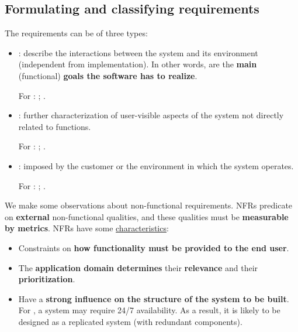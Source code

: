 \subsection{Formulating and classifying requirements}

The requirements can be of three types:
\begin{itemize}
    \item {}: describe the interactions between the system and its environment (independent from implementation). In other words, are the \textbf{main} (functional) \textbf{goals the software has to realize}.
    
    For \emph{}: ; .


    \item {}: further characterization of user-visible aspects of the system not directly related to functions.
    
    For \emph{}: ; .
    

    \item {}: imposed by the customer or the environment in which the system operates.
    
    For \emph{}: ; .
\end{itemize}
We make some observations about non-functional requirements. NFRs predicate on \textbf{external} non-functional qualities, and these qualities must be \textbf{measurable by metrics}. NFRs have some \underline{characteristics}:
\begin{itemize}
    \item Constraints on \textbf{how functionality must be provided to the end user}.

    \item The \textbf{application domain determines} their \textbf{relevance} and their \textbf{prioritization}.
    
    \item Have a \textbf{strong influence on the structure of the system to be built}. For , a system may require 24/7 availability. As a result, it is likely to be designed as a replicated system (with redundant components).
\end{itemize}

